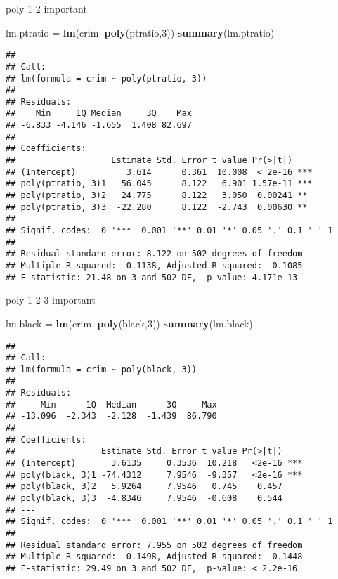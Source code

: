 \documentclass[]{article}
\newenvironment{Shaded}{\begin{snugshade}}{\end{snugshade}}
\newcommand{\DecValTok}[1]{\textcolor[rgb]{0.00,0.00,0.81}{#1}}
\newcommand{\KeywordTok}[1]{\textcolor[rgb]{0.13,0.29,0.53}{\textbf{#1}}}
\newcommand{\NormalTok}[1]{#1}
\newcommand{\OperatorTok}[1]{\textcolor[rgb]{0.81,0.36,0.00}{\textbf{#1}}}
\newcommand{\StringTok}[1]{\textcolor[rgb]{0.31,0.60,0.02}{#1}}
\begin{document}
poly 1 2 important

\begin{Shaded}
\begin{Highlighting}[]
\NormalTok{lm.ptratio =}\StringTok{ }\KeywordTok{lm}\NormalTok{(crim}\OperatorTok{~}\KeywordTok{poly}\NormalTok{(ptratio,}\DecValTok{3}\NormalTok{))}
\KeywordTok{summary}\NormalTok{(lm.ptratio)}
\end{Highlighting}
\end{Shaded}

\begin{verbatim}
## 
## Call:
## lm(formula = crim ~ poly(ptratio, 3))
## 
## Residuals:
##    Min     1Q Median     3Q    Max 
## -6.833 -4.146 -1.655  1.408 82.697 
## 
## Coefficients:
##                   Estimate Std. Error t value Pr(>|t|)    
## (Intercept)          3.614      0.361  10.008  < 2e-16 ***
## poly(ptratio, 3)1   56.045      8.122   6.901 1.57e-11 ***
## poly(ptratio, 3)2   24.775      8.122   3.050  0.00241 ** 
## poly(ptratio, 3)3  -22.280      8.122  -2.743  0.00630 ** 
## ---
## Signif. codes:  0 '***' 0.001 '**' 0.01 '*' 0.05 '.' 0.1 ' ' 1
## 
## Residual standard error: 8.122 on 502 degrees of freedom
## Multiple R-squared:  0.1138, Adjusted R-squared:  0.1085 
## F-statistic: 21.48 on 3 and 502 DF,  p-value: 4.171e-13
\end{verbatim}

poly 1 2 3 important

\begin{Shaded}
\begin{Highlighting}[]
\NormalTok{lm.black =}\StringTok{ }\KeywordTok{lm}\NormalTok{(crim}\OperatorTok{~}\KeywordTok{poly}\NormalTok{(black,}\DecValTok{3}\NormalTok{))}
\KeywordTok{summary}\NormalTok{(lm.black)}
\end{Highlighting}
\end{Shaded}

\begin{verbatim}
## 
## Call:
## lm(formula = crim ~ poly(black, 3))
## 
## Residuals:
##     Min      1Q  Median      3Q     Max 
## -13.096  -2.343  -2.128  -1.439  86.790 
## 
## Coefficients:
##                 Estimate Std. Error t value Pr(>|t|)    
## (Intercept)       3.6135     0.3536  10.218   <2e-16 ***
## poly(black, 3)1 -74.4312     7.9546  -9.357   <2e-16 ***
## poly(black, 3)2   5.9264     7.9546   0.745    0.457    
## poly(black, 3)3  -4.8346     7.9546  -0.608    0.544    
## ---
## Signif. codes:  0 '***' 0.001 '**' 0.01 '*' 0.05 '.' 0.1 ' ' 1
## 
## Residual standard error: 7.955 on 502 degrees of freedom
## Multiple R-squared:  0.1498, Adjusted R-squared:  0.1448 
## F-statistic: 29.49 on 3 and 502 DF,  p-value: < 2.2e-16
\end{verbatim}
\end{document}

